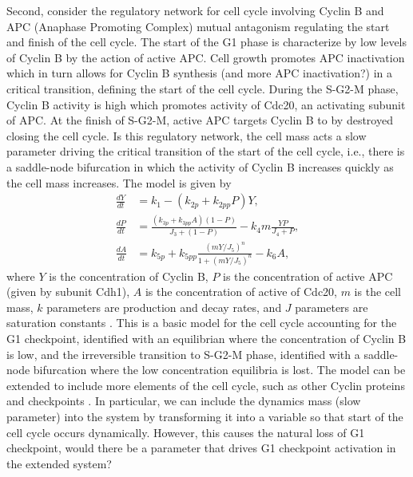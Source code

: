 \documentclass[12pt]{article}
\begin{document}
Second, consider the regulatory network for cell cycle involving Cyclin B and APC (Anaphase Promoting Complex) mutual antagonism regulating the start and finish of the cell cycle. The start of the G1 phase is characterize by low levels of Cyclin B by the action of active APC. Cell growth promotes APC inactivation which in turn allows for Cyclin B synthesis (and more APC inactivation?) in a critical transition, defining the start of the cell cycle. During the S-G2-M phase, Cyclin B activity is high which promotes activity of Cdc20, an activating subunit of APC. At the finish of S-G2-M, active APC targets Cyclin B to by destroyed closing the cell cycle. Is this regulatory network, the cell mass acts a slow parameter driving the critical transition of the start of the cell cycle, i.e., there is a saddle-node bifurcation in which the activity of Cyclin B increases quickly as the cell mass increases. The model is given by
\begin{equation}
    \begin{aligned}
        \frac{dY}{dt} &= k_{1} - (k_{2p} + k_{2pp}P)Y, \\
        \frac{dP}{dt} &= \frac{(k_{3p}+k_{3pp}A)(1-P)}{J_{3}+(1-P)} - k_{4}m\frac{YP}{J_{4}+P}, \\
        \frac{dA}{dt} &= k_{5p} + k_{5pp}\frac{(mY/J_{5})^{n}}{1+(mY/J_{5})^{n}} - k_{6}A,
    \end{aligned}
    \label{equ:Application:CyclinActivation:1D}
\end{equation}
where $Y$ is the concentration of Cyclin B, $P$ is the concentration of active APC (given by subunit Cdh1), $A$ is the concentration of active of Cdc20, $m$ is the cell mass, $k$ parameters are production and decay rates, and  $J$ parameters are saturation constants \citep{Segel2013,Tyson2001}. This is a basic model for the cell cycle accounting for the G1 checkpoint, identified with an equilibrian where the concentration of Cyclin B is low, and the irreversible transition to S-G2-M phase, identified with a saddle-node bifurcation where the low concentration equilibria is lost. The model can be extended to include more elements of the cell cycle, such as other Cyclin proteins and checkpoints \cite{Tyson2002,Tyson2003}. In particular, we can include the dynamics mass (slow parameter) into the system by transforming it into a variable so that start of the cell cycle occurs dynamically. However, this causes the natural loss of G1 checkpoint, would there be a parameter that drives G1 checkpoint activation in the extended system?
\end{document}
